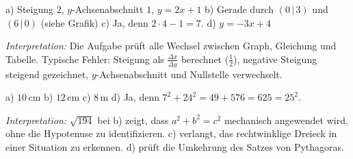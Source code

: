 \documentclass[11pt]{exam}
\newcommand{\aufgabe}[1]{%
  \needspace{8\baselineskip}%
  \renewcommand{\questionlabel}{\textbf{#1}}%
  \question}
\newcommand{\pkt}[2]{(#1\,|\,#2)}
\newcommand{\raum}[1]{\ifprintanswers\else\fillwithgrid{#1}\fi}
\newcommand{\diagnose}[1]{\par\smallskip\textit{Interpretation:} #1}
\begin{document}
\begin{questions}
\begin{solution}
  a) Steigung $2$, $y$-Achsenabschnitt $1$, $y = 2x + 1$ \quad
  b) Gerade durch $\pkt{0}{3}$ und $\pkt{6}{0}$ (siehe Grafik) \quad
  c) Ja, denn $2 \cdot 4 - 1 = 7$. \quad
  d) $y = -3x + 4$
  \diagnose{Die Aufgabe prüft alle Wechsel zwischen Graph, Gleichung und
  Tabelle. Typische Fehler: Steigung als $\frac{\Delta x}{\Delta y}$ berechnet
  ($\frac{1}{2}$), negative Steigung steigend gezeichnet, $y$-Achsenabschnitt
  und Nullstelle verwechselt.}
\end{solution}
\raum{3.5cm}

\aufgabe{8.5}
\begin{solution}
  a) $10$\,cm \quad b) $12$\,cm \quad c) $8$\,m \quad
  d) Ja, denn $7^2 + 24^2 = 49 + 576 = 625 = 25^2$.
  \diagnose{$\sqrt{194}$ bei b) zeigt, dass $a^2 + b^2 = c^2$ mechanisch
  angewendet wird, ohne die Hypotenuse zu identifizieren. c) verlangt, das
  rechtwinklige Dreieck in einer Situation zu erkennen. d) prüft die Umkehrung
  des Satzes von Pythagoras.}
\end{solution}
\raum{5cm}


\end{questions}
\end{document}
